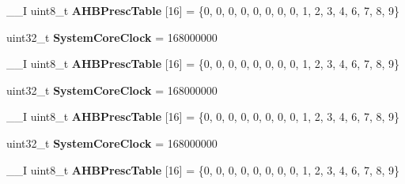 \begin{DoxyCompactItemize}
\item 
\hypertarget{group___s_t_m32_f4xx___system___private___variables_gacdc3ef54c0704c90e69a8a84fb2d970d}{\-\_\-\-\_\-\-I uint8\-\_\-t {\bfseries A\-H\-B\-Presc\-Table} \mbox{[}16\mbox{]} = \{0, 0, 0, 0, 0, 0, 0, 0, 1, 2, 3, 4, 6, 7, 8, 9\}}\label{group___s_t_m32_f4xx___system___private___variables_gacdc3ef54c0704c90e69a8a84fb2d970d}

\item 
\hypertarget{group___s_t_m32_f4xx___system___private___variables_gaa3cd3e43291e81e795d642b79b6088e6}{uint32\-\_\-t {\bfseries System\-Core\-Clock} = 168000000}\label{group___s_t_m32_f4xx___system___private___variables_gaa3cd3e43291e81e795d642b79b6088e6}

\item 
\hypertarget{group___s_t_m32_f4xx___system___private___variables_gacdc3ef54c0704c90e69a8a84fb2d970d}{\-\_\-\-\_\-\-I uint8\-\_\-t {\bfseries A\-H\-B\-Presc\-Table} \mbox{[}16\mbox{]} = \{0, 0, 0, 0, 0, 0, 0, 0, 1, 2, 3, 4, 6, 7, 8, 9\}}\label{group___s_t_m32_f4xx___system___private___variables_gacdc3ef54c0704c90e69a8a84fb2d970d}

\item 
\hypertarget{group___s_t_m32_f4xx___system___private___variables_gaa3cd3e43291e81e795d642b79b6088e6}{uint32\-\_\-t {\bfseries System\-Core\-Clock} = 168000000}\label{group___s_t_m32_f4xx___system___private___variables_gaa3cd3e43291e81e795d642b79b6088e6}

\item 
\hypertarget{group___s_t_m32_f4xx___system___private___variables_gacdc3ef54c0704c90e69a8a84fb2d970d}{\-\_\-\-\_\-\-I uint8\-\_\-t {\bfseries A\-H\-B\-Presc\-Table} \mbox{[}16\mbox{]} = \{0, 0, 0, 0, 0, 0, 0, 0, 1, 2, 3, 4, 6, 7, 8, 9\}}\label{group___s_t_m32_f4xx___system___private___variables_gacdc3ef54c0704c90e69a8a84fb2d970d}

\item 
\hypertarget{group___s_t_m32_f4xx___system___private___variables_gaa3cd3e43291e81e795d642b79b6088e6}{uint32\-\_\-t {\bfseries System\-Core\-Clock} = 168000000}\label{group___s_t_m32_f4xx___system___private___variables_gaa3cd3e43291e81e795d642b79b6088e6}

\item 
\hypertarget{group___s_t_m32_f4xx___system___private___variables_gacdc3ef54c0704c90e69a8a84fb2d970d}{\-\_\-\-\_\-\-I uint8\-\_\-t {\bfseries A\-H\-B\-Presc\-Table} \mbox{[}16\mbox{]} = \{0, 0, 0, 0, 0, 0, 0, 0, 1, 2, 3, 4, 6, 7, 8, 9\}}\label{group___s_t_m32_f4xx___system___private___variables_gacdc3ef54c0704c90e69a8a84fb2d970d}


\end{DoxyCompactItemize}
